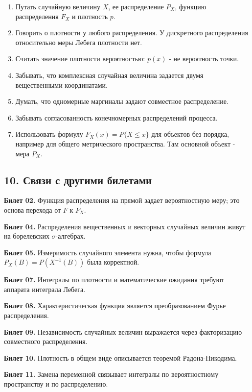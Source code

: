 \documentclass[
  11pt,
  a4paper,
]{article}
\begin{document}
\begin{enumerate}
\def\labelenumi{\arabic{enumi}.}
\item
  Путать случайную величину \(X\), ее распределение \(P_X\), функцию
  распределения \(F_X\) и плотность \(p\).
\item
  Говорить о плотности у любого распределения. У дискретного
  распределения относительно меры Лебега плотности нет.
\item
  Считать значение плотности вероятностью: \(p(x)\) - не вероятность
  точки.
\item
  Забывать, что комплексная случайная величина задается двумя
  вещественными координатами.
\item
  Думать, что одномерные маргиналы задают совместное распределение.
\item
  Забывать согласованность конечномерных распределений процесса.
\item
  Использовать формулу \(F_X(x)=P\{X\le x\}\) для объектов без порядка,
  например для общего метрического пространства. Там основной объект -
  мера \(P_X\).
\end{enumerate}

\subsection{10. Связи с другими
билетами}\label{ux441ux432ux44fux437ux438-ux441-ux434ux440ux443ux433ux438ux43cux438-ux431ux438ux43bux435ux442ux430ux43cux438}

\textbf{Билет 02.} Функция распределения на прямой задает вероятностную
меру; это основа перехода от \(F\) к \(P_X\).

\textbf{Билет 04.} Распределения вещественных и векторных случайных
величин живут на борелевских \(\sigma\)-алгебрах.

\textbf{Билет 05.} Измеримость случайного элемента нужна, чтобы формула
\(P_X(B)=P(X^{-1}(B))\) была корректной.

\textbf{Билет 07.} Интегралы по плотности и математические ожидания
требуют аппарата интеграла Лебега.

\textbf{Билет 08.} Характеристическая функция является преобразованием
Фурье распределения.

\textbf{Билет 09.} Независимость случайных величин выражается через
факторизацию совместного распределения.

\textbf{Билет 10.} Плотность в общем виде описывается теоремой
Радона-Никодима.

\textbf{Билет 11.} Замена переменной связывает интегралы по
вероятностному пространству и по распределению.
\end{document}

